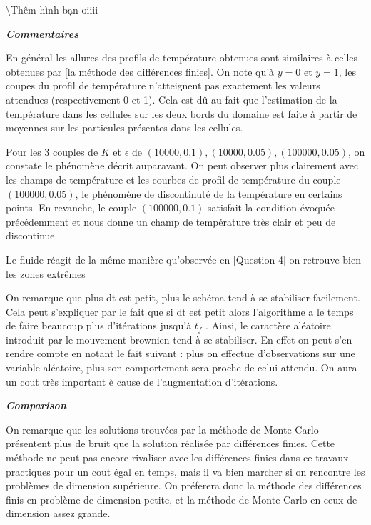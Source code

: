 \documentclass[
  11pt,
  dvipsnames]{article}
\begin{document}
\textbackslash Thêm hình bạn ơiiii

\textbf{\emph{Commentaires}}

En général les allures des profils de température obtenues sont similaires à celles obtenues par {[}la méthode des différences finies{]}. On note qu'à \(y = 0\) et \(y = 1\), les coupes du profil de température n'atteignent pas exactement les valeurs attendues (respectivement 0 et 1). Cela est dû au fait que l'estimation de la température dans les cellules sur les deux bords du domaine est faite à partir de moyennes sur les particules présentes dans les cellules.

Pour les 3 couples de \(K\) et \(\epsilon\) de \((10000, 0.1),(10000, 0.05),(100000, 0.05)\), on constate le phénomène décrit auparavant. On peut observer plus clairement avec les champs de température et les courbes de profil de température du couple \((100000, 0.05)\), le phénomène de discontinuté de la température en certains points. En revanche, le couple \((100000, 0.1)\) satisfait la condition évoquée précédemment et nous donne un champ de température très clair et peu de discontinue.

Le fluide réagit de la même manière qu'observée en {[}Question 4{]} on retrouve bien les zones extrêmes

On remarque que plus dt est petit, plus le schéma tend à se stabiliser facilement. Cela peut s'expliquer par le fait que si dt est petit alors l'algorithme a le temps de faire beaucoup plus d'itérations jusqu'à \(t_f\) . Ainsi, le caractère aléatoire introduit par le mouvement brownien tend à se stabiliser. En effet on peut s'en rendre compte en notant le fait suivant : plus on effectue d'observations sur une variable aléatoire, plus son comportement sera proche de celui attendu. On aura un cout très important è cause de l'augmentation d'itérations.

\textbf{\emph{Comparison}}

On remarque que les solutions trouvées par la méthode de Monte-Carlo présentent plus de bruit que la solution réalisée par différences finies. Cette méthode ne peut pas encore rivaliser avec les différences finies dans ce travaux practiques pour un cout égal en temps, mais il va bien marcher si on rencontre les problèmes de dimension supérieure. On préferera donc la méthode des différences finis en problème de dimension petite, et la méthode de Monte-Carlo en ceux de dimension assez grande.
\end{document}

